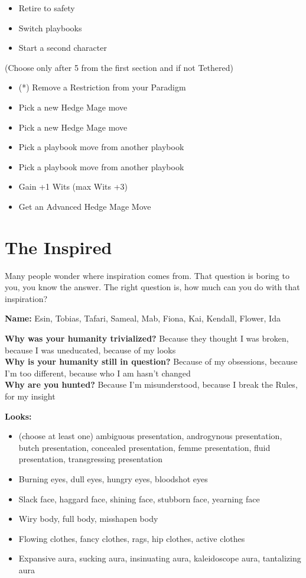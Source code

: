 \documentclass[
]{memoir}
\begin{document}
\begin{itemize}
\tightlist
\item
  Retire to safety
\item
  Switch playbooks
\item
  Start a second character
\end{itemize}

(Choose only after 5 from the first section and if not Tethered)

\begin{itemize}
\tightlist
\item
  (*) Remove a Restriction from your Paradigm
\item
  Pick a new Hedge Mage move
\item
  Pick a new Hedge Mage move
\item
  Pick a playbook move from another playbook
\item
  Pick a playbook move from another playbook
\item
  Gain +1 Wits (max Wits +3)
\item
  Get an Advanced Hedge Mage Move
\end{itemize}

\newpage

\hypertarget{the-inspired}{%
\section{The Inspired}\label{the-inspired}}

Many people wonder where inspiration comes from. That question is boring
to you, you know the answer. The right question is, how much can you do
with that inspiration?

\textbf{Name:} Esin, Tobias, Tafari, Sameal, Mab, Fiona, Kai, Kendall,
Flower, Ida

\textbf{Why was your humanity trivialized?} Because they thought I was
broken, because I was uneducated, because of my looks\\
\textbf{Why is your humanity still in question?} Because of my
obsessions, because I'm too different, because who I am hasn't changed\\
\textbf{Why are you hunted?} Because I'm misunderstood, because I break
the Rules, for my insight

\textbf{Looks:}

\begin{itemize}
\tightlist
\item
  (choose at least one) ambiguous presentation, androgynous
  presentation, butch presentation, concealed presentation, femme
  presentation, fluid presentation, transgressing presentation
\item
  Burning eyes, dull eyes, hungry eyes, bloodshot eyes
\item
  Slack face, haggard face, shining face, stubborn face, yearning face
\item
  Wiry body, full body, misshapen body
\item
  Flowing clothes, fancy clothes, rags, hip clothes, active clothes
\item
  Expansive aura, sucking aura, insinuating aura, kaleidoscope aura,
  tantalizing aura
\end{itemize}
\end{document}
